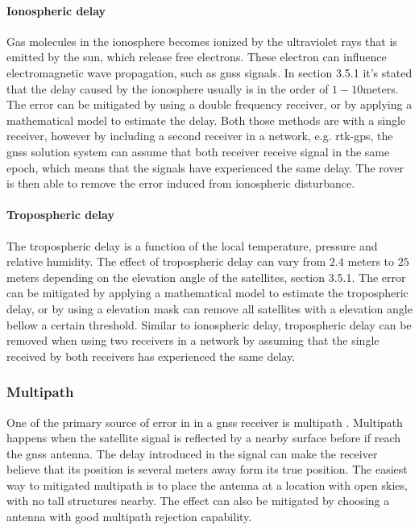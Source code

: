 \paragraph{Ionospheric delay}
Gas molecules in the ionosphere becomes ionized by the ultraviolet rays that is emitted by the sun, which release free electrons. These electron can influence electromagnetic wave propagation, such as \gls{gnss} signals. In \citep{vik2014integrated} section 3.5.1 it's stated that the delay caused by the ionosphere usually is in the order of $1-10 $meters. The error can be mitigated by using a double frequency receiver, or by applying a mathematical model to estimate the delay. Both those methods are with a single receiver, however by including a second receiver in a network, e.g. \gls{rtk-gps}, the \gls{gnss} solution system can assume that both receiver receive signal in the same epoch, which means that the signals have experienced the same delay. The rover is then able to remove the error induced from ionospheric disturbance.
\paragraph{Tropospheric delay}
The tropospheric delay is a function of the local temperature, pressure and relative humidity. The effect of tropospheric delay can  vary from $2.4$ meters to $25$ meters depending on the elevation angle of the satellites,\citep{vik2014integrated} section 3.5.1. The error can be mitigated by applying a mathematical model to estimate the tropospheric delay, or by using a elevation mask can remove all satellites with a elevation angle bellow a certain threshold. Similar to ionospheric delay, tropospheric delay can be removed when using two receivers in a network by assuming that the single received by both receivers has experienced the same delay. 

\subsubsection{Multipath}
One of the primary source of error in in a \gls{gnss} receiver is multipath \citep{misra2011global}. Multipath happens when the satellite signal is reflected by a nearby surface before if reach the \gls{gnss} antenna. The delay introduced in the signal can make the receiver believe that its position is several meters away form its true position. The easiest way to mitigated multipath is to place the antenna at a location with open skies, with no tall structures nearby. The effect can also be mitigated by choosing a antenna with good multipath rejection capability.

